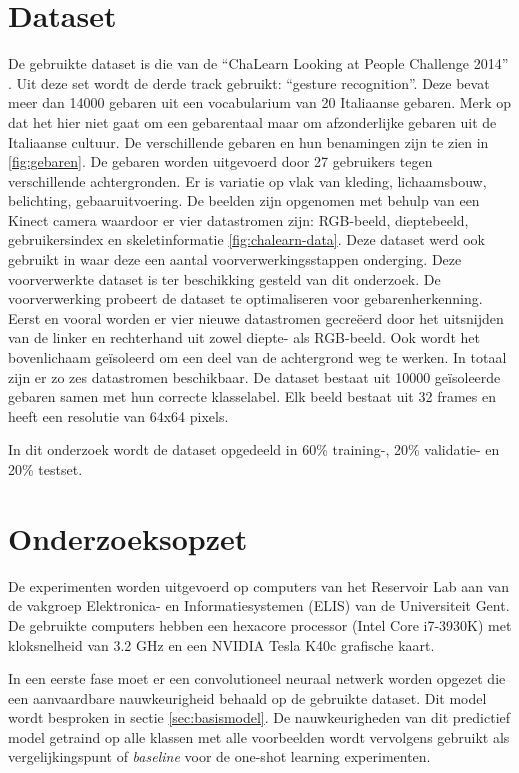 \section{Dataset}
De gebruikte dataset is die van de ``ChaLearn Looking at People Challenge 2014'' \cite{escalera_chalearn_2014}. Uit deze set wordt de derde track gebruikt: ``gesture recognition''. Deze bevat meer dan 14000 gebaren uit een vocabularium van 20 Italiaanse gebaren. Merk op dat het hier niet gaat om een gebarentaal maar om afzonderlijke gebaren uit de Italiaanse cultuur. De verschillende gebaren en hun benamingen zijn te zien in \ref{fig:gebaren}.
\npar De gebaren worden uitgevoerd door 27 gebruikers tegen verschillende achtergronden. Er is variatie op vlak van kleding, lichaamsbouw, belichting, gebaaruitvoering. De beelden zijn opgenomen met behulp van een Kinect camera waardoor er vier datastromen zijn: RGB-beeld, dieptebeeld, gebruikersindex en skeletinformatie \ref{fig:chalearn-data}.
\npar Deze dataset werd ook gebruikt in \cite{lionel} waar deze een aantal voorverwerkingsstappen onderging. Deze voorverwerkte dataset is ter beschikking gesteld van dit onderzoek. De voorverwerking probeert de dataset te optimaliseren voor gebarenherkenning. Eerst en vooral worden er vier nieuwe datastromen gecre\"eerd door het uitsnijden van de linker en rechterhand uit zowel diepte- als RGB-beeld. Ook wordt het bovenlichaam ge\"isoleerd om een deel van de achtergrond weg te werken. In totaal zijn er zo zes datastromen beschikbaar. De dataset bestaat uit 10000 ge\"isoleerde gebaren samen met hun correcte klasselabel. Elk beeld bestaat uit 32 frames en heeft een resolutie van 64x64 pixels.

\npar In dit onderzoek wordt de dataset opgedeeld in 60\% training-, 20\% validatie- en 20\% testset.


\section{Onderzoeksopzet}

De experimenten worden uitgevoerd op computers van het Reservoir Lab aan van de vakgroep Elektronica- en Informatiesystemen (ELIS) van de Universiteit Gent. De gebruikte computers hebben een hexacore processor (Intel Core i7-3930K) met kloksnelheid van 3.2 GHz en een NVIDIA Tesla K40c grafische kaart.

\npar In een eerste fase moet er een convolutioneel neuraal netwerk worden opgezet die een aanvaardbare nauwkeurigheid behaald op de gebruikte dataset. Dit model wordt besproken in sectie \ref{sec:basismodel}. De nauwkeurigheden van dit predictief model getraind op alle klassen met alle voorbeelden wordt vervolgens gebruikt als vergelijkingspunt of \textit{baseline} voor de one-shot learning experimenten.

